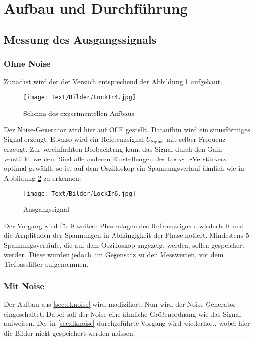\section{Aufbau und Durchführung}

\subsection{Messung des Ausgangssignals}
\subsubsection{Ohne Noise \label{sec:dknoise}}
Zunächst wird der der Versuch entsprechend der Abbildung \ref{fig:Aufbau3} aufgebaut.
\begin{figure}[H]
  \centering
  \texttt{[image: Text/Bilder/LockIn4.jpg]}
  \caption{Schema des experimentellen Aufbaus\cite[4]{sample}}
  \label{fig:Aufbau3}
\end{figure}
Der Noise-Generator wird hier auf OFF gestellt. Daraufhin wird ein
sinusförmiges Signal erzeugt.
Ebenso wird ein Referenzsignal $U_\text{Signal}$ mit selber Frequenz erzeugt. Zur vereinfachten Beobachtung kann das Signal
durch den Gain verstärkt werden.
Sind alle anderen Einstellungen des Lock-In-Verstärkers optimal gewählt, so ist auf dem Oszilloskop
ein Spannungsverlauf ähnlich wie in Abbildung \ref{fig:OUout} zu erkennen.
\begin{figure}[H]
  \centering
  \texttt{[image: Text/Bilder/LockIn6.jpg]}
  \caption{Ausgangssignal\cite[3]{sample}}
  \label{fig:OUout}
\end{figure}
Der Vorgang wird für 9 weitere Phasenlagen des Referenzsignals wiederholt und die Amplituden der
Spannungen in Abhängigkeit der Phase notiert.
Mindestens 5 Spannungsverläufe, die auf dem Oszilloskop angezeigt werden, sollen gespeichert werden.
Diese wurden jedoch, im Gegensatz zu den Messwerten, vor dem Tiefpassfilter aufgenommen.
\subsubsection{Mit Noise}
Der Aufbau aus \ref{sec:dknoise} wird modizifiert. Nun wird der Noise-Generator eingeschaltet. Dabei soll der Noise
eine ähnliche Größenordnung wie das Signal aufweisen.
Der in \ref{sec:dknoise} durchgeführte Vorgang wird wiederholt, wobei hier die Bilder nicht gespeichert werden müssen.

